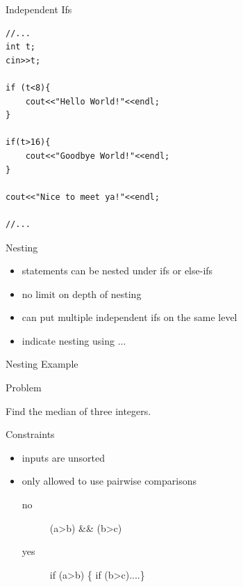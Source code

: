 \documentclass[xcolor={dvipsnames}]{beamer}
\begin{document}
\begin{frame}[fragile]{Independent Ifs}
\begin{verbatim}
//...
int t;
cin>>t;

if (t<8){
    cout<<"Hello World!"<<endl;
}  

if(t>16){
    cout<<"Goodbye World!"<<endl;
}

cout<<"Nice to meet ya!"<<endl;

//...   
\end{verbatim}
\end{frame}
\begin{frame}{Nesting}
	\begin{itemize}
		\item statements can be nested under ifs or else-ifs
		\item no limit on depth of nesting
		\item can put multiple independent ifs on the same level
		\item indicate nesting using { ...}
	\end{itemize}
\end{frame}

\begin{frame}{Nesting Example}
	\begin{block}{Problem}
		\begin{center}
	 		Find the median of three  integers.
		\end{center}
	\end{block}
	\pause
	\begin{block}{Constraints}
		\begin{itemize}
			\item inputs are unsorted
			\item only allowed to use pairwise comparisons 
			\begin{description}
				\item[no] (a\textgreater b) \&\& (b\textgreater c)
				\item[yes] if (a\textgreater b) \{ if (b\textgreater c)....\}
			\end{description}
		\end{itemize}
	\end{block}
\end{frame}
\end{document}
